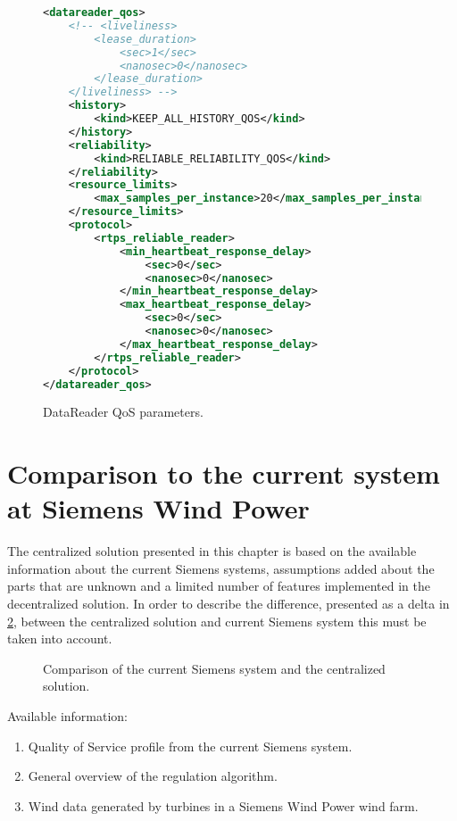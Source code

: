 \begin{figure}
\begin{lstlisting}[language=XML]
<datareader_qos>
	<!-- <liveliness>
		<lease_duration>
			<sec>1</sec>
			<nanosec>0</nanosec>
		</lease_duration>
	</liveliness> -->
	<history>
		<kind>KEEP_ALL_HISTORY_QOS</kind>
	</history>
	<reliability>
		<kind>RELIABLE_RELIABILITY_QOS</kind>
	</reliability>
	<resource_limits>
		<max_samples_per_instance>20</max_samples_per_instance>
	</resource_limits>
	<protocol>
		<rtps_reliable_reader>
			<min_heartbeat_response_delay>
				<sec>0</sec>
				<nanosec>0</nanosec>
			</min_heartbeat_response_delay>
			<max_heartbeat_response_delay>
				<sec>0</sec>
				<nanosec>0</nanosec>
			</max_heartbeat_response_delay>
		</rtps_reliable_reader>
	</protocol>
</datareader_qos>
\end{lstlisting}
\caption[DataReader QoS parameters]{
		\label{fig:readerQoS} 
		\footnotesize{DataReader QoS parameters.}
	}
\end{figure}


\section{Comparison to the current system at Siemens Wind Power}
The centralized solution presented in this chapter is based on the available information about the current Siemens systems, assumptions added about the parts that are unknown and a limited number of features implemented in the decentralized solution. In order to describe the difference, presented as a delta in \cref{fig:projectDiffOverviewCentralizedSiemens}, between the centralized solution and current Siemens system this must be taken into account.

\begin{figure}[!h]
	\centering
	
	\caption[Comparison of the current Siemens system and the centralized solution]{
		\label{fig:projectDiffOverviewCentralizedSiemens} 
		\footnotesize{%
			Comparison of the current Siemens system and the centralized solution.
		}
	}
\end{figure}

Available information:

\begin{enumerate}
	\item Quality of Service profile from the current Siemens system.
	\item General overview of the regulation algorithm.
	\item Wind data generated by turbines in a Siemens Wind Power wind farm.
\end{enumerate}

